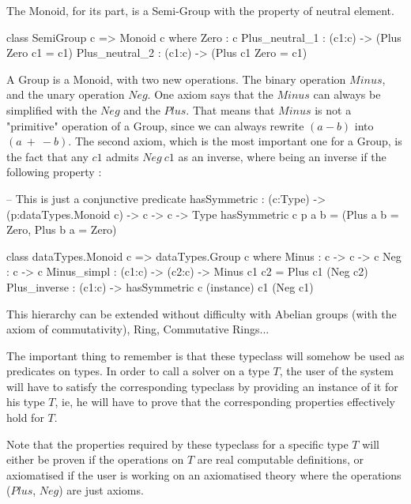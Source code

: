 \documentclass{sigplanconf}
\begin{document}
The Monoid, for its part, is a Semi-Group with the property of neutral element.

\begin{code}[caption=Monoid, captionpos=b, label=lst1:haskell2]   
class SemiGroup c => Monoid c where
    Zero : c    
    Plus_neutral_1 : (c1:c) 
            -> (Plus Zero c1 = c1)    
    Plus_neutral_2 : (c1:c) 
             -> (Plus c1 Zero = c1)
\end{code}	

A Group is a Monoid, with two new operations. The binary operation $Minus$, and the unary operation $Neg$. One axiom says that the $Minus$ can always be simplified with the $Neg$ and the $Plus$. That means that $Minus$ is not a "primitive" operation of a Group, since we can always rewrite $(a-b)$ into $(a\ +\ -b)$.
The second axiom, which is the most important one for a Group, is the fact that any $c1$ admits $Neg\ c1$ as an inverse, where being an inverse if the following property :

\begin{code}[caption=Group, captionpos=b, label=lst1:haskell2]   
-- This is just a conjunctive predicate
hasSymmetric : (c:Type) -> (p:dataTypes.Monoid c) 
                -> c -> c -> Type
hasSymmetric c p a b = 
         (Plus a b = Zero, Plus b a = Zero)    
  
class dataTypes.Monoid c => dataTypes.Group c where
	Minus : c -> c -> c
	Neg : c -> c
	Minus_simpl : (c1:c) -> (c2:c) -> 
	             Minus c1 c2 = Plus c1 (Neg c2) 
	Plus_inverse : (c1:c) -> 
	             hasSymmetric c (instance) c1 (Neg c1)
\end{code}	

This hierarchy can be extended without difficulty with Abelian groups (with the axiom of commutativity), Ring, Commutative Rings...

The important thing to remember is that these typeclass will somehow be used as predicates on types. In order to call a solver on a type $T$, the user of the system will have to satisfy the corresponding typeclass by providing an instance of it for his type $T$, ie, he will have to prove that the corresponding properties effectively hold for $T$.

Note that the properties required by these typeclass for a specific type $T$ will either be proven if the operations on $T$ are real computable definitions, or axiomatised if the user is working on an axiomatised theory where the operations ($Plus$, $Neg$) are just axioms.
\end{document}

